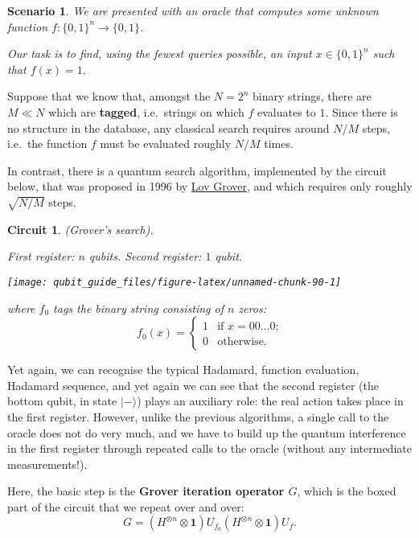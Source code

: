 \documentclass[fleqn]{article}
\newtheorem*{scenario}{Scenario}
\newtheorem*{circuit}{Circuit}
\begin{document}
\begin{scenario}
We are presented with an oracle that computes some unknown function \(f\colon\{0,1\}^n\to\{0,1\}\).

Our task is to find, using the fewest queries possible, an input \(x\in\{0,1\}^n\) such that \(f(x)=1\).

\end{scenario}

Suppose that we know that, amongst the \(N=2^n\) binary strings, there are \(M\ll N\) which are \textbf{tagged}, i.e.~strings on which \(f\) evaluates to \(1\).
Since there is no structure in the database, any classical search requires around \(N/M\) steps, i.e.~the function \(f\) must be evaluated roughly \(N/M\) times.

In contrast, there is a quantum search algorithm, implemented by the circuit below, that was proposed in 1996 by \href{https://en.wikipedia.org/wiki/Lov_Grover}{Lov Grover}, and which requires only roughly \(\sqrt{N/M}\) steps.

\begin{circuit}

(Grover's search).

\emph{First register: \(n\) qubits. Second register: \(1\) qubit.}

\begin{center}\texttt{[image: qubit\_guide\_files/figure-latex/unnamed-chunk-90-1]} \end{center}

where \(f_0\) tags the binary string consisting of \(n\) zeros:
\[
  f_0(x)
  = \begin{cases}
    1 &\text{if $x=00\ldots0$;}
  \\0 &\text{otherwise.}
  \end{cases}
\]

\end{circuit}

Yet again, we can recognise the typical Hadamard, function evaluation, Hadamard sequence, and yet again we can see that the second register (the bottom qubit, in state \(|-\rangle\)) plays an auxiliary role: the real action takes place in the first register.
However, unlike the previous algorithms, a single call to the oracle does not do very much, and we have to build up the quantum interference in the first register through repeated calls to the oracle (without any intermediate measurements!).

Here, the basic step is the \textbf{Grover iteration operator \(G\)}, which is the boxed part of the circuit that we repeat over and over:
\[
  G = (H^{\otimes n}\otimes\mathbf{1}) U_{f_0}(H^{\otimes n}\otimes\mathbf{1}) U_f.
\]
\end{document}
